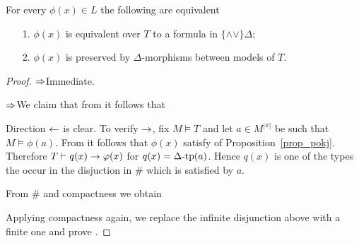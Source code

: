 \begin{lemma}\label{lem_qfdefinability}
For every $\phi(x)\in L$ the following are equivalent
\begin{itemize}
\item[1.] $\phi(x)$ is equivalent over $T$ to a formula in $\{\mathord\wedge\mathord\vee\}\Delta$;
\item[2.] $\phi(x)$ is preserved by $\Delta$-morphisms between models of $T$.
\end{itemize}
\end{lemma}
\begin{proof} $\Rightarrow$\quad Immediate.

$\Rightarrow$\quad  We claim that from  it follows that



Direction $\leftarrow$ is clear. To verify $\rightarrow$, fix $M\models T$ and let $a\in M^{|x|}$ be such that $M\models\phi(a)$.  From  it follows that $\phi(x)$ satisfy  of Proposition~\ref{prop_pokj}. Therefore $T\vdash q(x)\rightarrow\varphi(x)$ for $q(x)=\Delta\mbox{-}\textrm{tp}(a)$. Hence $q(x)$ is one of the types the occur in the disjuction in $\#$ which is satisfied by $a$.

From $\#$ and compactness we obtain


Applying compactness again, we replace the infinite disjunction above with a finite one and prove .
\end{proof}
















